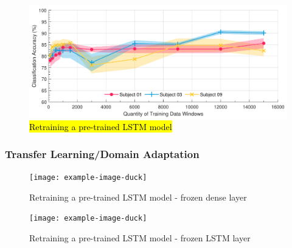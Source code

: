 

\begin{figure}[htbp]
    \centering
    \includegraphics[width=\textwidth]{content/5-Personalisation/ch5_pre_trained_moddel_accuracy.pdf}
    \caption[Retraining a pre-trained LSTM model]{\hl{Retraining a pre-trained LSTM model}}
    \label{fig:ch5_pretrained_model}
\end{figure}

\subsubsection{Transfer Learning/Domain Adaptation}

\begin{figure}[htbp]
    \centering
    \texttt{[image: example-image-duck]}
    \caption[Retraining a pre-trained LSTM model]{Retraining a pre-trained LSTM model - frozen dense layer}
    \label{fig:ch5_freezing_dense_layer}
\end{figure}

\begin{figure}[htbp]
    \centering
    \texttt{[image: example-image-duck]}
    \caption[Retraining a pre-trained LSTM model]{Retraining a pre-trained LSTM model - frozen LSTM layer}
    \label{fig:ch5_freezing_LSTM_layer}
\end{figure}

